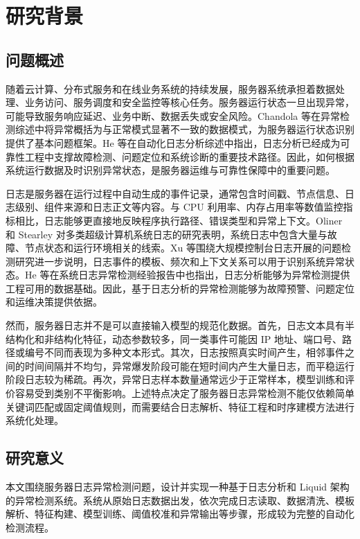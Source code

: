 \chapter{研究背景}
\vspace{7pt}

\section{问题概述}

随着云计算、分布式服务和在线业务系统的持续发展，服务器系统承担着数据处理、业务访问、服务调度和安全监控等核心任务。服务器运行状态一旦出现异常，可能导致服务响应延迟、业务中断、数据丢失或安全风险。Chandola 等在异常检测综述中将异常概括为与正常模式显著不一致的数据模式，为服务器运行状态识别提供了基本问题框架\cite{chandola2009anomaly}。He 等在自动化日志分析综述中指出，日志分析已经成为可靠性工程中支撑故障检测、问题定位和系统诊断的重要技术路径\cite{he2021survey}。因此，如何根据系统运行数据及时识别异常状态，是服务器运维与可靠性保障中的重要问题。

日志是服务器在运行过程中自动生成的事件记录，通常包含时间戳、节点信息、日志级别、组件来源和日志正文等内容。与 CPU 利用率、内存占用率等数值监控指标相比，日志能够更直接地反映程序执行路径、错误类型和异常上下文。Oliner 和 Stearley 对多类超级计算机系统日志的研究表明，系统日志中包含大量与故障、节点状态和运行环境相关的线索\cite{oliner2007supercomputers}。Xu 等围绕大规模控制台日志开展的问题检测研究进一步说明，日志事件的模板、频次和上下文关系可以用于识别系统异常状态\cite{xu2009detecting}。He 等在系统日志异常检测经验报告中也指出，日志分析能够为异常检测提供工程可用的数据基础\cite{he2016experience}。因此，基于日志分析的异常检测能够为故障预警、问题定位和运维决策提供依据。

然而，服务器日志并不是可以直接输入模型的规范化数据。首先，日志文本具有半结构化和非结构化特征，动态参数较多，同一类事件可能因 IP 地址、端口号、路径或编号不同而表现为多种文本形式。其次，日志按照真实时间产生，相邻事件之间的时间间隔并不均匀，异常爆发阶段可能在短时间内产生大量日志，而平稳运行阶段日志较为稀疏。再次，异常日志样本数量通常远少于正常样本，模型训练和评价容易受到类别不平衡影响。上述特点决定了服务器日志异常检测不能仅依赖简单关键词匹配或固定阈值规则，而需要结合日志解析、特征工程和时序建模方法进行系统化处理。

\section{研究意义}

本文围绕服务器日志异常检测问题，设计并实现一种基于日志分析和 Liquid 架构的异常检测系统。系统从原始日志数据出发，依次完成日志读取、数据清洗、模板解析、特征构建、模型训练、阈值校准和异常输出等步骤，形成较为完整的自动化检测流程。

